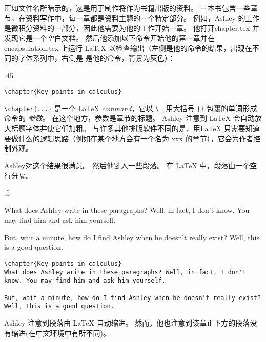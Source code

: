 正如文件名所暗示的，这是用于制作将作为书籍出版的资料。 一本书包含一些章节，在资料写作中，每一章都是资料主题的一个特定部分。 例如，Ashley 的工作是微积分资料的一部分，因此他需要为他的工作开始一章。 他打开chapter.tex 并发现它是一个空白文档。 然后他添加以下命令开始他的第一章并在 encapsulation.tex 上运行 \LaTeX{} 以检查输出（左侧是他的命令的结果，出现在不同的字体系列中，右侧是 是他的命令，背景为灰色）：

\begin{miniexammar}{.45\textandmarginlen}{}
\begin{lstlisting}
\chapter{Key points in calculus}
\end{lstlisting}
\end{miniexammar}
\verb=\chapter{...}= 是一个 \LaTeX{} \emph{command}，它以 \verb=\=%
. 用大括号 \verb={}= 包裹的单词形成命令的 \emph{参数}。 在这个地方，参数是章节的标题。 Ashley 注意到 \LaTeX{} 会自动放大标题字体并使它们加粗。 与许多其他排版软件不同的是，用\LaTeX{} 只需要知道要做什么的逻辑思路（例如在某个地方会有一个名为 xxx 的章节），它会为作者控制外观。

Ashley对这个结果很满意。 然后他键入一些段落。 在 \LaTeX{} 中，段落由一个空行分隔。

\begin{miniexammar}{.5\textandmarginlen}{
%
What does Ashley write in these paragraphs? Well, in fact, I don't know. You may find him and ask him yourself.
		
\hspace{1.5em}But, wait a minute, how do I find Ashley when he doesn't really exist? Well, this is a good question.}
\begin{lstlisting}
\chapter{Key points in calculus}
What does Ashley write in these paragraphs? Well, in fact, I don't know. You may find him and ask him yourself.
		
But, wait a minute, how do I find Ashley when he doesn't really exist? Well, this is a good question.
\end{lstlisting}
\end{miniexammar}
Ashley 注意到段落由 \LaTeX{} 自动缩进。 然而，他也注意到该章正下方的段落没有缩进(在中文环境中有所不同)。

